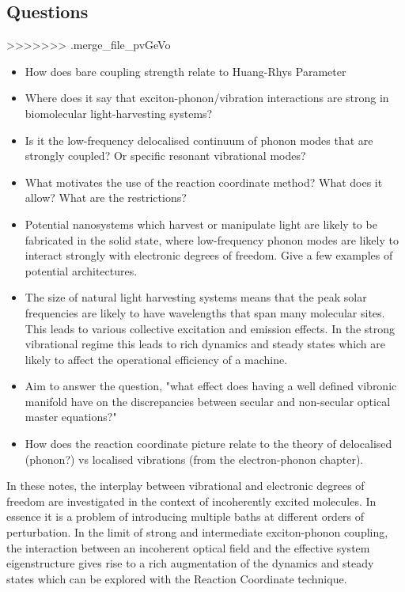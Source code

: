 \documentclass[]{article}
\begin{document}
\subsection{Questions}
>>>>>>> .merge_file_pvGeVo
\begin{itemize}
	\item How does bare coupling strength relate to Huang-Rhys Parameter
	\item Where does it say that exciton-phonon/vibration interactions are strong in biomolecular light-harvesting systems?
	\item Is it the low-frequency delocalised continuum of phonon modes that are strongly coupled? Or specific resonant vibrational modes?
	\item What motivates the use of the reaction coordinate method? What does it allow? What are the restrictions?
	\item Potential nanosystems which harvest or manipulate light are likely to be fabricated in the solid state, where low-frequency phonon modes are likely to interact strongly with electronic degrees of freedom. Give a few examples of potential architectures.
	\item The size of natural light harvesting systems means that the peak solar frequencies are likely to have wavelengths that span many molecular sites. This leads to various collective excitation and emission effects. In the strong vibrational regime this leads to rich dynamics and steady states which are likely to affect the operational efficiency of a machine.
	\item Aim to answer the question, "what effect does having a well defined vibronic manifold have on the discrepancies between secular and non-secular optical master equations?" 
	\item How does the reaction coordinate picture relate to the theory of delocalised (phonon?) vs localised vibrations (from the electron-phonon chapter). 
\end{itemize}
In these notes, the interplay between vibrational and electronic degrees of freedom are investigated in the context of incoherently excited molecules. In essence it is a problem of introducing multiple baths at different orders of perturbation. In the limit of strong and intermediate exciton-phonon coupling, the interaction between an incoherent optical field and the effective system eigenstructure gives rise to a rich augmentation of the dynamics and steady states which can be explored with the Reaction Coordinate technique.
\end{document}

